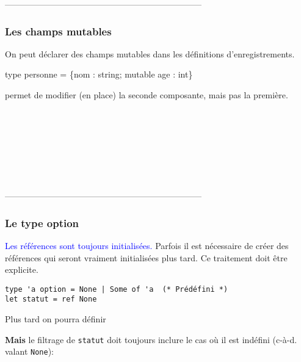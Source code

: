 ---------------------------------------------------------------------
%
\begin{frame}
\frametitle{Les champs mutables}

On peut déclarer des champs mutables dans les définitions
d'enregistrements. 

\textsf{type personne = \{nom : string; mutable age : int\}}

permet de modifier (en place) la seconde composante, mais pas la
première.

\\
\\
\\
\\
\\
\\

\end{frame}

---------------------------------------------------------------------
%
\begin{frame}
\frametitle{Le type option}

\textcolor{blue}{Les références sont toujours initialisées.} Parfois il est
nécessaire de créer des références qui seront vraiment initialisées
plus tard. Ce traitement doit être explicite.

\begin{verbatim}
type 'a option = None | Some of 'a  (* Prédéfini *)
let statut = ref None
\end{verbatim}

Plus tard on pourra définir 


\textbf{Mais} le filtrage de \texttt{statut} doit toujours inclure le cas
où il est indéfini (c-à-d. valant \texttt{None}):


\end{frame}

